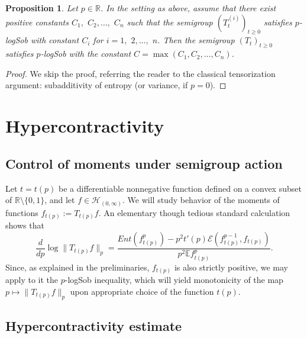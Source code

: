 \documentclass[11pt]{amsart}
\newcommand{\R}{\mathbb{R}}
\newcommand{\E}{\mathbb{E}}
\newcommand{\1}{\mathbf{1}}
\def\R{{\mathbb R}}
\def\e{{\mathcal{E}}}
\def\E{{\mathbb E}}
\def\H{{\mathcal{H}}}
\theoremstyle{definition}
\theoremstyle{plain}
\newtheorem{proposition}[example]{Proposition}
\theoremstyle{remark}
\numberwithin{equation}{section}
\begin{document}
\begin{proposition} \label{tensor}
Let $p \in \R$. In the setting as above, assume that there exist positive constants $C_{1},$ $C_{2},\ldots,$ $C_{n}$ such that the semigroup $(T^{(i)}_{t})_{t \geq 0}$ satisfies $p$-logSob with constant $C_{i}$ for $i=1,$ $2,\ldots,$ $n$. Then the semigroup $(T_{t})_{t \geq 0}$ satisfies $p$-logSob with the constant $C=\max(C_{1}, C_{2},\ldots, C_{n})$.
\end{proposition}

\begin{proof}
We skip the proof, referring the reader to the classical tensorization argument: subadditivity of entropy (or variance, if $p=0$).
\end{proof}

\section{Hypercontractivity}

\subsection{Control of moments under semigroup action}

Let $t=t(p)$ be a differentiable nonnegative function defined on a convex subset of $\R \setminus \{ 0, 1\}$, and let $f \in \H_{(0, \infty)}$. We will study behavior of the moments of functions $f_{t(p)}:=T_{t(p)}f$. An elementary though tedious standard calculation shows that
\begin{equation} \label{der}
\frac{d}{dp} \log \| T_{t(p)}f \|_{p}=
\frac{Ent(f_{t(p)}^{p})-p^{2}t'(p)\e(f_{t(p)}^{p-1}, f_{t(p)})}{p^{2}\E f_{t(p)}^{p}}.
\end{equation}
Since, as explained in the preliminaries, $f_{t(p)}$ is also strictly positive, we may apply to it the $p$-logSob inequality, which will yield monotonicity of the map
$p \mapsto \| T_{t(p)}f\|_{p}$ upon appropriate choice
of the function $t(p)$.

\subsection{Hypercontractivity estimate}
\end{document}
